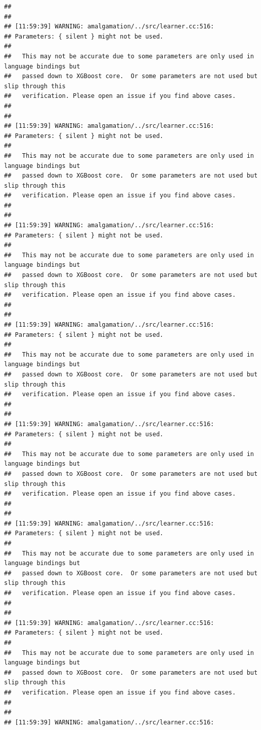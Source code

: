 \documentclass[AMS,STIX2COL]{WileyNJD-v2}\usepackage[]{graphicx}\usepackage[]{color}
\makeatletter
\newenvironment{kframe}{%
 \def\at@end@of@kframe{}%
 \ifinner\ifhmode%
  \def\at@end@of@kframe{\end{minipage}}%
  \begin{minipage}{\columnwidth}%
 \fi\fi%
 \def\FrameCommand##1{\hskip\@totalleftmargin \hskip-\fboxsep
 \colorbox{shadecolor}{##1}\hskip-\fboxsep
     \hskip-\linewidth \hskip-\@totalleftmargin \hskip\columnwidth}%
 \MakeFramed {\advance\hsize-\width
   \@totalleftmargin\z@ \linewidth\hsize
   \@setminipage}}%
 {\par\unskip\endMakeFramed%
 \at@end@of@kframe}
\newenvironment{knitrout}{}{} %
\makeatother
\begin{document}
\begin{knitrout}
\begin{kframe}
\begin{verbatim}
## 
## 
## [11:59:39] WARNING: amalgamation/../src/learner.cc:516: 
## Parameters: { silent } might not be used.
## 
##   This may not be accurate due to some parameters are only used in language bindings but
##   passed down to XGBoost core.  Or some parameters are not used but slip through this
##   verification. Please open an issue if you find above cases.
## 
## 
## [11:59:39] WARNING: amalgamation/../src/learner.cc:516: 
## Parameters: { silent } might not be used.
## 
##   This may not be accurate due to some parameters are only used in language bindings but
##   passed down to XGBoost core.  Or some parameters are not used but slip through this
##   verification. Please open an issue if you find above cases.
## 
## 
## [11:59:39] WARNING: amalgamation/../src/learner.cc:516: 
## Parameters: { silent } might not be used.
## 
##   This may not be accurate due to some parameters are only used in language bindings but
##   passed down to XGBoost core.  Or some parameters are not used but slip through this
##   verification. Please open an issue if you find above cases.
## 
## 
## [11:59:39] WARNING: amalgamation/../src/learner.cc:516: 
## Parameters: { silent } might not be used.
## 
##   This may not be accurate due to some parameters are only used in language bindings but
##   passed down to XGBoost core.  Or some parameters are not used but slip through this
##   verification. Please open an issue if you find above cases.
## 
## 
## [11:59:39] WARNING: amalgamation/../src/learner.cc:516: 
## Parameters: { silent } might not be used.
## 
##   This may not be accurate due to some parameters are only used in language bindings but
##   passed down to XGBoost core.  Or some parameters are not used but slip through this
##   verification. Please open an issue if you find above cases.
## 
## 
## [11:59:39] WARNING: amalgamation/../src/learner.cc:516: 
## Parameters: { silent } might not be used.
## 
##   This may not be accurate due to some parameters are only used in language bindings but
##   passed down to XGBoost core.  Or some parameters are not used but slip through this
##   verification. Please open an issue if you find above cases.
## 
## 
## [11:59:39] WARNING: amalgamation/../src/learner.cc:516: 
## Parameters: { silent } might not be used.
## 
##   This may not be accurate due to some parameters are only used in language bindings but
##   passed down to XGBoost core.  Or some parameters are not used but slip through this
##   verification. Please open an issue if you find above cases.
## 
## 
## [11:59:39] WARNING: amalgamation/../src/learner.cc:516: 

\end{verbatim}
\end{kframe}
\end{knitrout}
\end{document}
